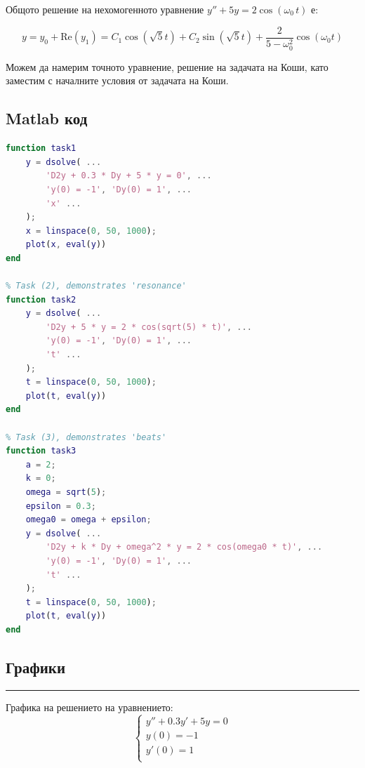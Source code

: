 \documentclass[11pt]{article}
\begin{document}
\begin{flushleft}
    Общото решение на нехомогенното уравнение $y'' + 5y = 2 \cos(\omega_0 \, t)$ е:

    $$y = y_0 + \text{Re}(y_1) = C_1 \cos(\sqrt{5}t) + C_2 \sin(\sqrt{5}t) + \dfrac{2}{5 - \omega_0^2}\cos(\omega_0 t)$$

    Можем да намерим точното уравнение, решение на задачата на Коши, като заместим с началните условия от задачата на Коши. \\
\end{flushleft}

\newpage

\subsection{Matlab код}

\begin{lstlisting}[language=Matlab]
% Task (1), demonstrates 'friction'
function task1
    y = dsolve( ...
        'D2y + 0.3 * Dy + 5 * y = 0', ...
        'y(0) = -1', 'Dy(0) = 1', ...
        'x' ...
    );
    x = linspace(0, 50, 1000);
    plot(x, eval(y))
end

% Task (2), demonstrates 'resonance'
function task2
    y = dsolve( ...
        'D2y + 5 * y = 2 * cos(sqrt(5) * t)', ...
        'y(0) = -1', 'Dy(0) = 1', ...
        't' ...
    );
    t = linspace(0, 50, 1000);
    plot(t, eval(y))
end

% Task (3), demonstrates 'beats'
function task3
    a = 2;
    k = 0;
    omega = sqrt(5);
    epsilon = 0.3;
    omega0 = omega + epsilon;
    y = dsolve( ...
        'D2y + k * Dy + omega^2 * y = 2 * cos(omega0 * t)', ...
        'y(0) = -1', 'Dy(0) = 1', ...
        't' ...
    );
    t = linspace(0, 50, 1000);
    plot(t, eval(y))
end
\end{lstlisting}

\newpage

\subsection{Графики}

\noindent
\hrule height 0.1pt
\vskip 0.2cm

Графика на решението на уравнението:
$$
\begin{cases}
    y'' + 0.3y' + 5y = 0 \\
    y(0) = -1 \\
    y'(0) = 1 \\
\end{cases}
$$
\end{document}
